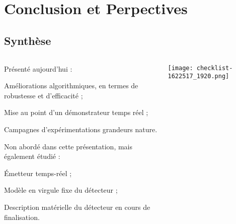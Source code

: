 \documentclass[../main.tex]{subfiles}
\begin{document}
\section{Conclusion et Perpectives}

\subsection{Synthèse}

\begin{frame}{\subsecname}
  \begin{columns}
    \begin{column}{.7 \linewidth}
      Présenté aujourd'hui :
      \begin{ctrlitemize}{.2 em} \small
        \item Améliorations algorithmiques, en termes de robustesse et d'efficacité ;
        \item Mise au point d'un démonstrateur temps réel ;
        \item Campagnes d'expérimentations grandeurs nature.
      \end{ctrlitemize} \vspace{1 em}

      Non abordé dans cette présentation, mais également étudié :
      \begin{ctrlitemize}{.2 em} \small
        \item Émetteur temps-réel ;
        \item Modèle en virgule fixe du détecteur ;
        \item Description matérielle du détecteur en cours de finalisation.
      \end{ctrlitemize}
    \end{column}
    \begin{column}{.3 \linewidth}
      \texttt{[image: checklist-1622517\_1920.png]}
    \end{column}
  \end{columns}
\end{frame}
\end{document}
